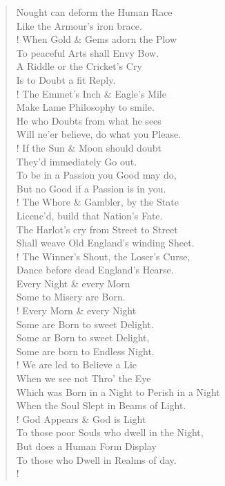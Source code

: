 \documentclass[9pt]{extarticle}
\newcommand{\attrib}[1]{%
	\nopagebreak{\vspace{2ex}\raggedleft #1\par}}
\begin{document}
\begin{verse}
\begin{altverse}
		Nought can deform the Human Race\\
		Like the Armour's iron brace.\\
		!
		When Gold \& Gems adorn the Plow\\
		To peaceful Arts shall Envy Bow.\\
		A Riddle or the Cricket's Cry\\
		Is to Doubt a fit Reply.\\
		!
		The Emmet's Inch \& Eagle's Mile\\
		Make Lame Philosophy to smile.\\
		He who Doubts from what he sees\\
		Will ne'er believe, do what you Please.\\
		!
		If the Sun \& Moon should doubt\\
		They'd immediately Go out.\\
		To be in a Passion you Good may do,\\
		But no Good if a Passion is in you.\\
		!
		The Whore \& Gambler, by the State\\
		Licenc'd, build that Nation's Fate.\\
		The Harlot's cry from Street to Street\\
		Shall weave Old England's winding Sheet.\\
		!
		The Winner's Shout, the Loser's Curse,\\
		Dance before dead England's Hearse.\\
		Every Night \& every Morn\\
		Some to Misery are Born.\\
		!
		Every Morn \& every Night\\
		Some are Born to sweet Delight.\\
		Some ar Born to sweet Delight,\\
		Some are born to Endless Night.\\
		!
		We are led to Believe a Lie\\
		When we see not Thro' the Eye\\
		Which was Born in a Night to Perish in a Night\\
		When the Soul Slept in Beams of Light.\\
		!
		God Appears \& God is Light\\
		To those poor Souls who dwell in the Night,\\
		But does a Human Form Display\\
		To those who Dwell in Realms of day.\\!
		
	\end{altverse}
\end{verse}
\attrib{ William Blake (1803)}
\end{document}
